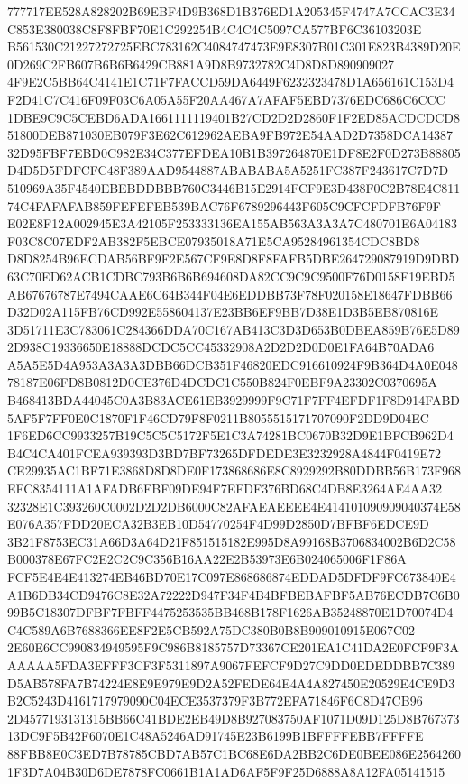 \documentclass[UTF8,fontset=fandol,zihao=-4,a4paper]{ctexart}
\begin{document}
{{777717EE528A828202B69EBF4D9B368D1B376ED1A205345F4747A7CCAC3E34C853E380038C8F8FBF70E1C292254B4C4C4C5097CA577BF6C36103203E
B561530C21227272725EBC783162C4084747473E9E8307B01C301E823B4389D20E0D269C2FB607B6B6B6429CB881A9D8B9732782C4D8D8D890909027
4F9E2C5BB64C4141E1C71F7FACCD59DA6449F6232323478D1A656161C153D4F2D41C7C416F09F03C6A05A55F20AA467A7AFAF5EBD7376EDC686C6CCC
1DBE9C9C5CEBD6ADA1661111119401B27CD2D2D2860F1F2ED85ACDCDCD851800DEB871030EB079F3E62C612962AEBA9FB972E54AAD2D7358DCA14387
32D95FBF7EBD0C982E34C377EFDEA10B1B397264870E1DF8E2F0D273B88805D4D5D5FDFCFC48F389AAD9544887ABABABA5A5251FC387F243617C7D7D
510969A35F4540EBEBDDBBB760C3446B15E2914FCF9E3D438F0C2B78E4C81174C4FAFAFAB859FEFEFEB539BAC76F6789296443F605C9CFCFDFB76F9F
E02E8F12A002945E3A42105F253333136EA155AB563A3A3A7C480701E6A04183F03C8C07EDF2AB382F5EBCE07935018A71E5CA95284961354CDC8BD8
D8D8254B96ECDAB56BF9F2E567CF9E8D8F8FAFB5DBE264729087919D9DBD63C70ED62ACB1CDBC793B6B6B694608DA82CC9C9C9500F76D0158F19EBD5
AB67676787E7494CAAE6C64B344F04E6EDDBB73F78F020158E18647FDBB66D32D02A115FB76CD992E558604137E23BB6EF9BB7D38E1D3B5EB870816E
3D51711E3C783061C284366DDA70C167AB413C3D3D653B0DBEA859B76E5D892D938C19336650E18888DCDC5CC45332908A2D2D2D0D0E1FA64B70ADA6
A5A5E5D4A953A3A3A3DBB66DCB351F46820EDC916610924F9B364D4A0E04878187E06FD8B0812D0CE376D4DCDC1C550B824F0EBF9A23302C0370695A
B468413BDA44045C0A3B83ACE61EB3929999F9C71F7FF4EFDF1F8D914FABD5AF5F7FF0E0C1870F1F46CD79F8F0211B8055515171707090F2DD9D04EC
1F6ED6CC9933257B19C5C5C5172F5E1C3A74281BC0670B32D9E1BFCB962D4B4C4CA401FCEA939393D3BD7BF73265DFDEDE3E3232928A4844F0419E72
CE29935AC1BF71E3868D8D8DE0F173868686E8C8929292B80DDBB56B173F968EFC8354111A1AFADB6FBF09DE94F7EFDF376BD68C4DB8E3264AE4AA32
32328E1C393260C0002D2D2DB6000C82AFAEAEEEE4E414101090909040374E58E076A357FDD20ECA32B3EB10D54770254F4D99D2850D7BFBF6EDCE9D
3B21F8753EC31A66D3A64D21F851515182E995D8A99168B3706834002B6D2C58B000378E67FC2E2C2C9C356B16AA22E2B53973E6B024065006F1F86A
FCF5E4E4E413274EB46BD70E17C097E868686874EDDAD5DFDF9FC673840E4A1B6DB34CD9476C8E32A72222D947F34F4B4BFBEBAFBF5AB76ECDB7C6B0
99B5C18307DFBF7FBFF4475253535BB468B178F1626AB35248870E1D70074D4C4C589A6B7688366EE8F2E5CB592A75DC380B0B8B909010915E067C02
2E60E6CC990834949595F9C986B8185757D73367CE201EA1C41DA2E0FCF9F3AAAAAA5FDA3EFFF3CF3F5311897A9067FEFCF9D27C9DD0EDEDDBB7C389
D5AB578FA7B74224E8E9E979E9D2A52FEDE64E4A4A827450E20529E4CE9D3B2C5243D4161717979090C04ECE3537379F3B772EFA71846F6C8D47CB96
2D4577193131315BB66C41BDE2EB49D8B927083750AF1071D09D125D8B76737313DC9F5B42F6070E1C48A5246AD91745E23B6199B1BFFFFEBB7FFFFE
88FBB8E0C3ED7B78785CBD7AB57C1BC68E6DA2BB2C6DE0BEE086E25642601F3D7A04B30D6DE7878FC0661B1A1AD6AF5F9F25D6888A8A12FA05141515
}}
\end{document}
